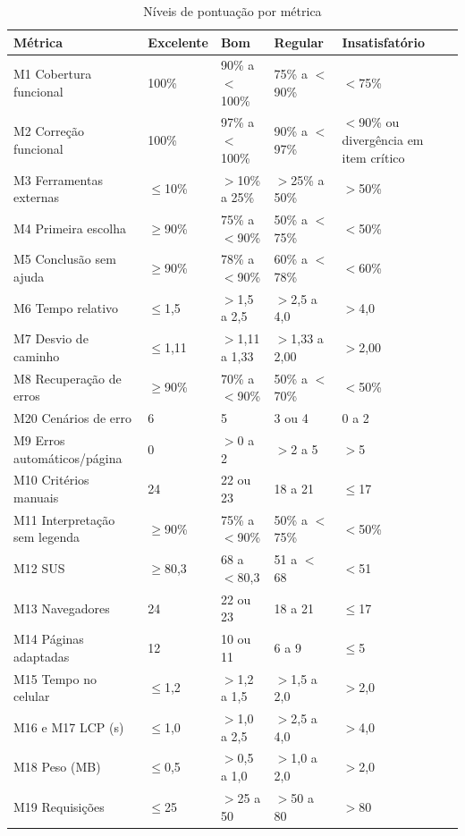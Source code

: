 \begin{table}[htb]
	\caption{Níveis de pontuação por métrica}
	\label{tab:niveis}
	\centering
	\scriptsize
	\begin{tabularx}{\textwidth}{L{3.9cm} C{1.6cm} C{2.1cm} C{2.1cm} Y}
		\toprule
		\textbf{Métrica} & \textbf{Excelente} & \textbf{Bom} & \textbf{Regular} & \textbf{Insatisfatório} \\
		\midrule
		M1 Cobertura funcional & 100\% & 90\% a $<$100\% & 75\% a $<$90\% & $<$75\% \\
		M2 Correção funcional & 100\% & 97\% a $<$100\% & 90\% a $<$97\% & $<$90\% ou divergência em item crítico \\
		M3 Ferramentas externas & $\leq$10\% & $>$10\% a 25\% & $>$25\% a 50\% & $>$50\% \\
		M4 Primeira escolha & $\geq$90\% & 75\% a $<$90\% & 50\% a $<$75\% & $<$50\% \\
		M5 Conclusão sem ajuda & $\geq$90\% & 78\% a $<$90\% & 60\% a $<$78\% & $<$60\% \\
		M6 Tempo relativo & $\leq$1,5 & $>$1,5 a 2,5 & $>$2,5 a 4,0 & $>$4,0 \\
		M7 Desvio de caminho & $\leq$1,11 & $>$1,11 a 1,33 & $>$1,33 a 2,00 & $>$2,00 \\
		M8 Recuperação de erros & $\geq$90\% & 70\% a $<$90\% & 50\% a $<$70\% & $<$50\% \\
		M20 Cenários de erro & 6 & 5 & 3 ou 4 & 0 a 2 \\
		M9 Erros automáticos/página & 0 & $>$0 a 2 & $>$2 a 5 & $>$5 \\
		M10 Critérios manuais & 24 & 22 ou 23 & 18 a 21 & $\leq$17 \\
		M11 Interpretação sem legenda & $\geq$90\% & 75\% a $<$90\% & 50\% a $<$75\% & $<$50\% \\
		M12 SUS & $\geq$80,3 & 68 a $<$80,3 & 51 a $<$68 & $<$51 \\
		M13 Navegadores & 24 & 22 ou 23 & 18 a 21 & $\leq$17 \\
		M14 Páginas adaptadas & 12 & 10 ou 11 & 6 a 9 & $\leq$5 \\
		M15 Tempo no celular & $\leq$1,2 & $>$1,2 a 1,5 & $>$1,5 a 2,0 & $>$2,0 \\
		M16 e M17 LCP (s) & $\leq$1,0 & $>$1,0 a 2,5 & $>$2,5 a 4,0 & $>$4,0 \\
		M18 Peso (MB) & $\leq$0,5 & $>$0,5 a 1,0 & $>$1,0 a 2,0 & $>$2,0 \\
		M19 Requisições & $\leq$25 & $>$25 a 50 & $>$50 a 80 & $>$80 \\
		\bottomrule
	\end{tabularx}
\end{table}

